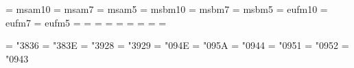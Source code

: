 
\font\tenmsa    = msam10
\font\sevenmsa  = msam7
\font\fivemsa   = msam5
\font\tenmsb    = msbm10
\font\sevenmsb  = msbm7
\font\fivemsb   = msbm5
\font\teneufm   = eufm10
\font\seveneufm = eufm7
\font\fiveeufm  = eufm5
\newfam\msafam  %
\newfam\msbfam  %
\newfam\eufmfam %
\textfont\msafam          = \tenmsa
\scriptfont\msafam        = \sevenmsa
\scriptscriptfont\msafam  = \fivemsa
\textfont\msbfam          = \tenmsb
\scriptfont\msbfam        = \sevenmsb
\scriptscriptfont\msbfam  = \fivemsb
\textfont\eufmfam         = \teneufm
\scriptfont\eufmfam       = \seveneufm
\scriptscriptfont\eufmfam = \fiveeufm

\mathchardef\leqslant     = "3836
\mathchardef\geqslant     = "383E
\mathchardef\subsetneq    = "3928
\mathchardef\supsetneq    = "3929
\mathchardef\N            = "094E
\mathchardef\Z            = "095A
\mathchardef\D            = "0944
\mathchardef\Q            = "0951
\mathchardef\R            = "0952
\mathchardef\C            = "0943

\def\bbb{\fam\msbfam}
\def\frak{\fam\eufmfam}

\endinput
